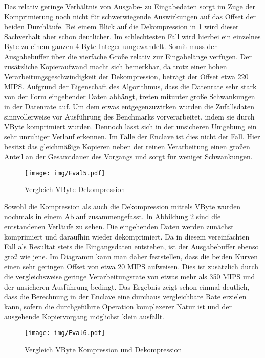 Das relativ geringe Verhältnis von Ausgabe- zu Eingabedaten sorgt im Zuge der Komprimierung noch nicht für schwerwiegende Auswirkungen auf das Offset der beiden Durchläufe. Bei einem Blick auf die Dekompression in \ref{fig:eval5} wird dieser Sachverhalt aber schon deutlicher. Im schlechtesten Fall wird hierbei ein einzelnes Byte zu einem ganzen 4 Byte Integer umgewandelt. Somit muss der Ausgabebuffer über die vierfache Größe relativ zur Eingabelänge verfügen. Der zusätzliche Kopieraufwand macht sich bemerkbar, da trotz einer hohen Verarbeitungsgeschwindigkeit der Dekompression, beträgt der Offset etwa 220 MIPS. Aufgrund der Eigenschaft des Algorithmus, dass die Datenrate sehr stark von der Form eingehender Daten abhängt, treten mitunter große Schwankungen in der Datenrate auf. Um dem etwas entgegenzuwirken wurden die Zufallsdaten sinnvollerweise vor Ausführung des Benchmarks vorverarbeitet, indem sie durch VByte komprimiert wurden. Dennoch lässt sich in der unsicheren Umgebung ein sehr unruhiger Verlauf erkennen. Im Falle der Enclave ist dies nicht der Fall. Hier besitzt das gleichmäßige Kopieren neben der reinen Verarbeitung einen großen Anteil an der Gesamtdauer des Vorgangs und sorgt für weniger Schwankungen.

\begin{figure}[h]
	\texttt{[image: img/Eval5.pdf]}
	\centering
	\caption{Vergleich VByte Dekompression}
	\label{fig:eval5}
\end{figure}

Sowohl die Kompression als auch die Dekompression mittels VByte wurden nochmals in einem Ablauf zusammengefasst. In Abbildung \ref{fig:eval6} sind die entstandenen Verläufe zu sehen. Die eingehenden Daten werden zunächst komprimiert und daraufhin wieder dekomprimiert. Da in diesem vereinfachten Fall als Resultat stets die Eingangsdaten entstehen, ist der Ausgabebuffer ebenso groß wie jene. Im Diagramm kann man daher feststellen, dass die beiden Kurven einen sehr geringen Offset von etwa 20 MIPS aufweisen. Dies ist zusätzlich durch die vergleichsweise geringe Verarbeitungsrate von etwas mehr als 350 MIPS und der unsicheren Ausführung bedingt. Das Ergebnis zeigt schon einmal deutlich, dass die Berechnung in der Enclave eine durchaus vergleichbare Rate erzielen kann, sofern die durchgeführte Operation komplexerer Natur ist und der ausgehende Kopiervorgang möglichst klein ausfällt.

\begin{figure}[h]
	\texttt{[image: img/Eval6.pdf]}
	\centering
	\caption{Vergleich VByte Kompression und Dekompression}
	\label{fig:eval6}
\end{figure}

